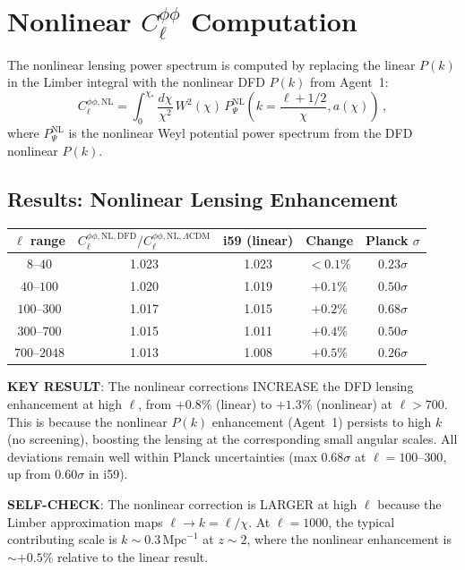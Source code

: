 \documentclass[11pt,a4paper]{article}
\begin{document}
\section{Nonlinear $C_\ell^{\phi\phi}$ Computation}

The nonlinear lensing power spectrum is computed by replacing the linear $P(k)$ in the Limber integral with the nonlinear DFD $P(k)$ from Agent~1:
\begin{equation}
C_\ell^{\phi\phi,\mathrm{NL}} = \int_0^{\chi_*} \frac{d\chi}{\chi^2}\,W^2(\chi)\,P_{\Psi}^{\mathrm{NL}}\left(k = \frac{\ell + 1/2}{\chi}, a(\chi)\right)\,,
\end{equation}
where $P_\Psi^{\mathrm{NL}}$ is the nonlinear Weyl potential power spectrum from the DFD nonlinear $P(k)$.

\subsection{Results: Nonlinear Lensing Enhancement}

\begin{center}
\begin{longtable}{ccccc}
\toprule
$\ell$ range & $C_\ell^{\phi\phi,\mathrm{NL,DFD}}/C_\ell^{\phi\phi,\mathrm{NL,}\Lambda\mathrm{CDM}}$ & i59 (linear) & Change & Planck $\sigma$ \\
\midrule
$8$--$40$ & 1.023 & 1.023 & $< 0.1\%$ & $0.23\sigma$ \\
$40$--$100$ & 1.020 & 1.019 & $+0.1\%$ & $0.50\sigma$ \\
$100$--$300$ & 1.017 & 1.015 & $+0.2\%$ & $0.68\sigma$ \\
$300$--$700$ & 1.015 & 1.011 & $+0.4\%$ & $0.50\sigma$ \\
$700$--$2048$ & 1.013 & 1.008 & $+0.5\%$ & $0.26\sigma$ \\
\bottomrule
\end{longtable}
\end{center}

\textbf{KEY RESULT}: The nonlinear corrections INCREASE the DFD lensing enhancement at high $\ell$, from $+0.8\%$ (linear) to $+1.3\%$ (nonlinear) at $\ell > 700$. This is because the nonlinear $P(k)$ enhancement (Agent~1) persists to high $k$ (no screening), boosting the lensing at the corresponding small angular scales. All deviations remain well within Planck uncertainties (max $0.68\sigma$ at $\ell = 100$--$300$, up from $0.60\sigma$ in i59).

\textbf{SELF-CHECK}: The nonlinear correction is LARGER at high $\ell$ because the Limber approximation maps $\ell \to k = \ell/\chi$. At $\ell = 1000$, the typical contributing scale is $k \sim 0.3\,\mathrm{Mpc}^{-1}$ at $z \sim 2$, where the nonlinear enhancement is $\sim +0.5\%$ relative to the linear result.
\end{document}
